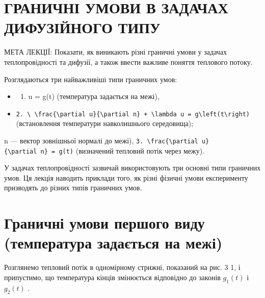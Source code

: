 \documentclass[
  ukrainian,
]{article}
\providecommand{\tightlist}{%
  \setlength{\itemsep}{0pt}\setlength{\parskip}{0pt}}
\begin{document}
\section{ГРАНИЧНІ УМОВИ В ЗАДАЧАХ ДИФУЗІЙНОГО
ТИПУ}\label{ux433ux440ux430ux43dux438ux447ux43dux456-ux443ux43cux43eux432ux438-ux432-ux437ux430ux434ux430ux447ux430ux445-ux434ux438ux444ux443ux437ux456ux439ux43dux43eux433ux43e-ux442ux438ux43fux443}

МЕТА ЛЕКЦІЇ: Показати, як виникають різні граничні умови у задачах
теплопровідності та дифузії, а також ввести важливе поняття теплового
потоку.

Розглядаються три найважливіші типи граничних умов:

\begin{itemize}
\tightlist
\item
  \begin{enumerate}
  \def\labelenumi{\arabic{enumi}.}
  \tightlist
  \item
    u = g(t) (температура задається на межі),
  \end{enumerate}
\item
  \texttt{2.\ \textbackslash{}\ \textbackslash{}frac\{\textbackslash{}partial\ u\}\{\textbackslash{}partial\ n\}\ +\ \textbackslash{}lambda\ u\ =\ g\textbackslash{}left(t\textbackslash{}right)}
  (встановлення температури навколишнього середовища);
\end{itemize}

n --- вектор зовнішньої нормалі до межі),
\texttt{3.\ \textbackslash{}frac\{\textbackslash{}partial\ u\}\{\textbackslash{}partial\ n\}\ =\ g(t)}
(визначений тепловий потік через межу).

У задачах теплопровідності зазвичай використовують три основні типи
граничних умов. Ця лекція наводить приклади того, як різні фізичні умови
експерименту призводять до різних типів граничних умов.

\section{Граничні умови першого виду (температура задається на
межі)}\label{ux433ux440ux430ux43dux438ux447ux43dux456-ux443ux43cux43eux432ux438-ux43fux435ux440ux448ux43eux433ux43e-ux432ux438ux434ux443-ux442ux435ux43cux43fux435ux440ux430ux442ux443ux440ux430-ux437ux430ux434ux430ux454ux442ux44cux441ux44f-ux43dux430-ux43cux435ux436ux456}

Розглянемо тепловий потік в одномірному стрижні, показаний на рис. 3 1,
і припустимо, що температура кінців змінюється відповідно до законів
\(g_1(t)\) і \(g_2(t)\) .
\end{document}
